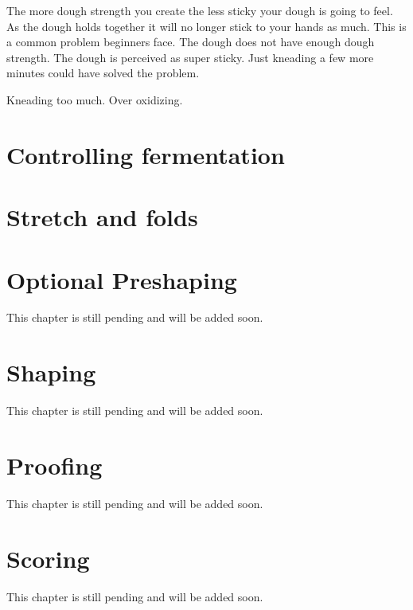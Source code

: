 The more dough strength you create the less sticky your dough is going to
feel. As the dough holds together it will no longer stick to your hands as
much. This is a common problem beginners face. The dough does not have enough
dough strength. The dough is perceived as super sticky. Just kneading a few
more minutes could have solved the problem.




Kneading too much.
Over oxidizing.

\section{Controlling fermentation}
\section{Stretch and folds}
\section{Optional Preshaping}
This chapter is still pending and will be added soon.

\section{Shaping}
This chapter is still pending and will be added soon.

\section{Proofing}
This chapter is still pending and will be added soon.

\section{Scoring}
This chapter is still pending and will be added soon.
